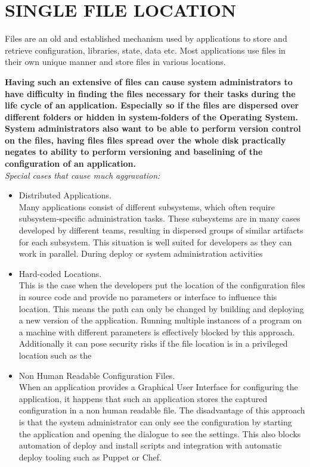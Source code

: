 \newpage
\section*{SINGLE FILE LOCATION}

Files are an old and established mechanism used by applications to store and retrieve configuration, libraries, state, data etc. Most applications use files in their own unique manner and store files in various locations.
\begin{center}
  
\end{center}

\textbf{Having such an extensive of files can cause system administrators to have difficulty in finding the files necessary for their tasks during the life cycle of an application. Especially so if the files are dispersed over different folders or hidden in system-folders of the Operating System. System administrators also want to be able to perform version control on the files, having files files spread  over the whole disk practically negates to ability to perform versioning and baselining of the configuration of an application.}\\

\textit{Special cases that cause much aggravation:}
\begin{itemize}
\item Distributed Applications.\\
Many applications consist of different subsystems, which often require  subsystem-specific administration tasks. These subsystems are in many cases developed by different teams, resulting in dispersed groups of similar artifacts for each subsystem. This situation is well suited for developers as they can work in parallel. During deploy or system administration activities 
\item Hard-coded Locations.\\
This is the case when the developers put the location of the configuration files in source code and provide no parameters or interface to influence this location. This means the path can only be changed by building and deploying a new version of the application. Running multiple instances of a program on a machine with different parameters is effectively blocked by this approach. Additionally it can pose security risks if the file location is in a privileged location such as the 
\item Non Human Readable Configuration Files.\\
When an application provides a Graphical User Interface for configuring the application, it happens that such an application stores the captured configuration in a non human readable file. The disadvantage of this approach is that the system administrator can only see the configuration by starting the application and opening the dialogue to see the settings. This also blocks automation of deploy and install scripts and integration with automatic deploy tooling such as Puppet or Chef.
\end{itemize}

